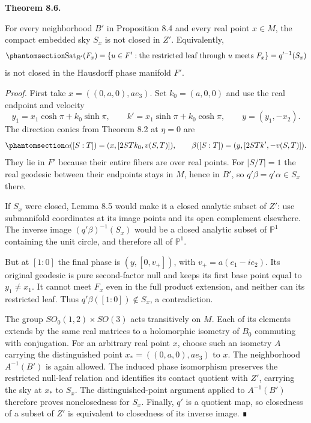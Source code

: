 \documentclass[
  english,
  11pt,
  reqno]{amsart}
\makeatletter
\newcommand{\pandocstatementheading}[1]{%
  \par\addpenalty{\@beginparpenalty}%
  \addvspace{.5\baselineskip plus .2\baselineskip minus .2\baselineskip}%
  {\normalfont\bfseries #1\par}%
  \nobreak\@afterindenttrue\@afterheading
}
\makeatother
\begin{document}
\pandocstatementheading{\protect{}\label{thm:nariai-all-real-nonclosed-point-skies-v09}Theorem 8.6.}

For every neighborhood \(B'\) in Proposition 8.4 and every real point
\(x\in M\), the compact embedded sky \(S_x\) is not closed in \(Z'\).
Equivalently,
\begin{equation}\protect\phantomsection\label{eq:nariai-point-saturation}{
\operatorname{Sat}_{R'}(F_x)
=\{u\in F':\text{the restricted leaf through }u\text{ meets }F_x\}
=q'^{-1}(S_x)
}\end{equation} is not closed in the Hausdorff phase manifold \(F'\).

\emph{Proof.} First take \(x=((0,a,0),ae_3)\). Set \(k_0=(a,0,0)\) and
use the real endpoint and velocity \[
y_1=x_1\cosh\pi+k_0\sinh\pi,
\qquad k'=x_1\sinh\pi+k_0\cosh\pi,
\qquad y=(y_1,-x_2).
\] The direction conics from Theorem 8.2 at \(\eta=0\) are
\begin{equation}\protect\phantomsection\label{eq:nariai-point-support-direction-conics}{
\alpha([S:T])=(x,[2STk_0,v(S,T)]),
\qquad
\beta([S:T])=(y,[2STk',-v(S,T)]).
}\end{equation} They lie in \(F'\) because their entire fibers are over
real points. For \(|S/T|=1\) the real geodesic between their endpoints
stays in \(M\), hence in \(B'\), so \(q'\beta=q'\alpha\in S_x\) there.

If \(S_x\) were closed, Lemma 8.5 would make it a closed analytic subset
of \(Z'\): use submanifold coordinates at its image points and its open
complement elsewhere. The inverse image \((q'\beta)^{-1}(S_x)\) would be
a closed analytic subset of \(\mathbb P^1\) containing the unit circle,
and therefore all of \(\mathbb P^1\).

But at \([1:0]\) the final phase is \((y,[0,v_+])\), with
\(v_+=a(e_1-ie_2)\). Its original geodesic is pure second-factor null
and keeps its first base point equal to \(y_1\ne x_1\). It cannot meet
\(F_x\) even in the full product extension, and neither can its
restricted leaf. Thus \(q'\beta([1:0])\notin S_x\), a contradiction.

The group \(SO_0(1,2)\times SO(3)\) acts transitively on \(M\). Each of
its elements extends by the same real matrices to a holomorphic isometry
of \(B_0\) commuting with conjugation. For an arbitrary real point
\(x\), choose such an isometry \(A\) carrying the distinguished point
\(x_*=((0,a,0),ae_3)\) to \(x\). The neighborhood \(A^{-1}(B')\) is
again allowed. The induced phase isomorphism preserves the restricted
null-leaf relation and identifies its contact quotient with \(Z'\),
carrying the sky at \(x_*\) to \(S_x\). The distinguished-point argument
applied to \(A^{-1}(B')\) therefore proves nonclosedness for \(S_x\).
Finally, \(q'\) is a quotient map, so closedness of a subset of \(Z'\)
is equivalent to closedness of its inverse image. ∎
\end{document}
